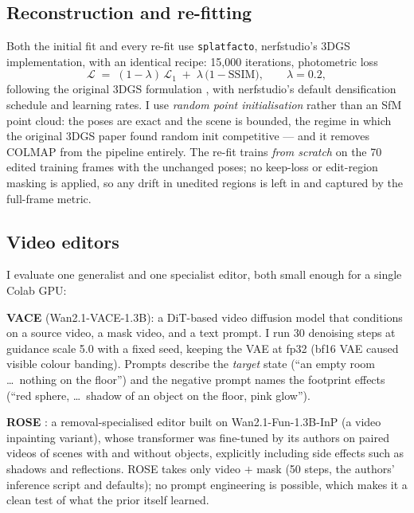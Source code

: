 \documentclass[11pt]{article}
\begin{document}
\subsection{Reconstruction and re-fitting}
\label{sec:recon}
Both the initial fit and every re-fit use \texttt{splatfacto}, nerfstudio's 3DGS implementation, with an identical recipe: 15{,}000 iterations, photometric loss
\[
\mathcal{L} \;=\; (1-\lambda)\,\mathcal{L}_1 \;+\; \lambda\,\bigl(1-\mathrm{SSIM}\bigr), \qquad \lambda = 0.2,
\]
following the original 3DGS formulation \cite{kerbl3dgs}, with nerfstudio's default densification schedule and learning rates. I use \emph{random point initialisation} rather than an SfM point cloud: the poses are exact and the scene is bounded, the regime in which the original 3DGS paper found random init competitive \cite{kerbl3dgs} --- and it removes COLMAP from the pipeline entirely. The re-fit trains \emph{from scratch} on the 70 edited training frames with the unchanged poses; no keep-loss or edit-region masking is applied, so any drift in unedited regions is left in and captured by the full-frame metric.

\subsection{Video editors}
\label{sec:editors}
I evaluate one generalist and one specialist editor, both small enough for a single Colab GPU:

\textbf{VACE} \cite{vace} (Wan2.1-VACE-1.3B): a DiT-based video diffusion model that conditions on a source video, a mask video, and a text prompt. I run 30 denoising steps at guidance scale 5.0 with a fixed seed, keeping the VAE at fp32 (bf16 VAE caused visible colour banding). Prompts describe the \emph{target} state (``an empty room \dots\ nothing on the floor'') and the negative prompt names the footprint effects (``red sphere, \dots\ shadow of an object on the floor, pink glow'').

\textbf{ROSE} \cite{rose}: a removal-specialised editor built on Wan2.1-Fun-1.3B-InP (a video inpainting variant), whose transformer was fine-tuned by its authors on paired videos of scenes with and without objects, explicitly including side effects such as shadows and reflections. ROSE takes only video $+$ mask (50 steps, the authors' inference script and defaults); no prompt engineering is possible, which makes it a clean test of what the prior itself learned.
\end{document}
